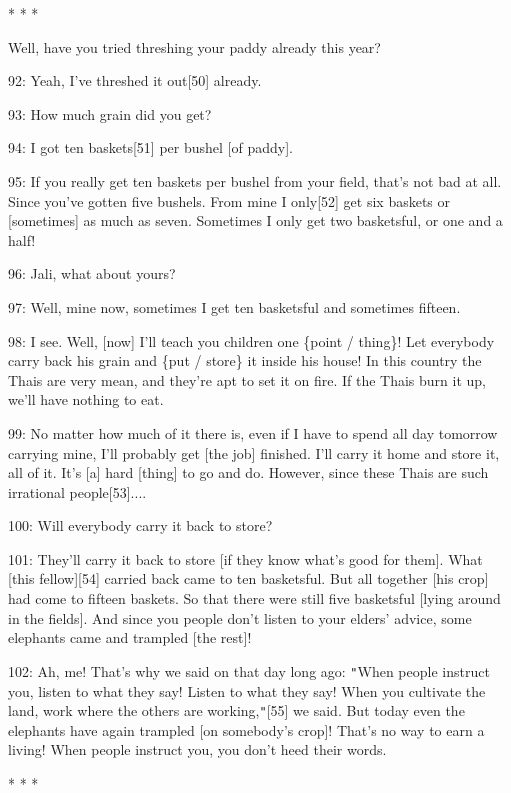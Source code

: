 \begin{center}
* * *
\end{center}

\leftskip=0pt
Well, have you tried threshing your paddy already this year?

92: Yeah, I've threshed it out[50] already.

93: How much grain did you get?

94: I got ten baskets[51] per bushel [of paddy].

95: If you really get ten baskets per bushel from your field, that's not bad at
all. Since you've gotten five bushels. From mine I only[52] get six baskets or
[sometimes] as much as seven. Sometimes I only get two basketsful, or one and a
half!

96: Jali, what about yours?

97: Well, mine now, sometimes I get ten basketsful and sometimes fifteen.

98: I see. Well, [now] I'll teach you children one \{point / thing\}! Let everybody
carry back his grain and \{put / store\} it inside his house! In this country the
Thais are very mean, and they're apt to set it on fire. If the Thais burn it up,
we'll have nothing to eat.

99: No matter how much of it there is, even if I have to spend all day tomorrow
carrying mine, I'll probably get [the job] finished. I'll carry it home and store
it, all of it. It's [a] hard [thing] to go and do. However, since these Thais are
such irrational people[53]....

100: Will everybody carry it back to store?

101: They'll carry it back to store [if they know what's good for them]. What [this
fellow][54] carried back came to ten basketsful. But all together [his crop] had
come to fifteen baskets. So that there were still five basketsful [lying around
in the fields]. And since you people don't listen to your elders' advice, some
elephants came and trampled [the rest]!

102: Ah, me! That's why we said on that day long ago: \texttt{"}When people instruct
you, listen to what they say! Listen to what they say! When you cultivate the land,
work where the others are working,\texttt{"}[55] we said. But today even the elephants
have again trampled [on somebody's crop]! That's no way to earn a living! When
people instruct you, you don't heed their words.

\begin{center}
* * *
\end{center}

